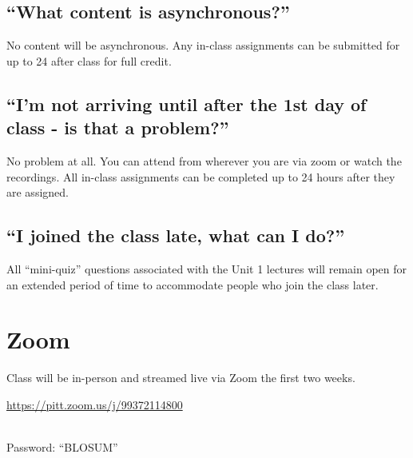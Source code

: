 \documentclass[
]{book}
\begin{document}
\hypertarget{what-content-is-asynchronous}{%
\section{``What content is asynchronous?''}\label{what-content-is-asynchronous}}

No content will be asynchronous. Any in-class assignments can be submitted for up to 24 after class for full credit.

\hypertarget{im-not-arriving-until-after-the-1st-day-of-class---is-that-a-problem}{%
\section{``I'm not arriving until after the 1st day of class - is that a problem?''}\label{im-not-arriving-until-after-the-1st-day-of-class---is-that-a-problem}}

No problem at all. You can attend from wherever you are via zoom or watch the recordings. All in-class assignments can be completed up to 24 hours after they are assigned.

\hypertarget{i-joined-the-class-late-what-can-i-do}{%
\section{``I joined the class late, what can I do?''}\label{i-joined-the-class-late-what-can-i-do}}

All ``mini-quiz'' questions associated with the Unit 1 lectures will remain open for an extended period of time to accommodate people who join the class later.

\hypertarget{zoom}{%
\chapter{Zoom}\label{zoom}}

Class will be in-person and streamed live via Zoom the first two weeks.

\url{https://pitt.zoom.us/j/99372114800}\strut \\
Password: ``BLOSUM''
\end{document}
